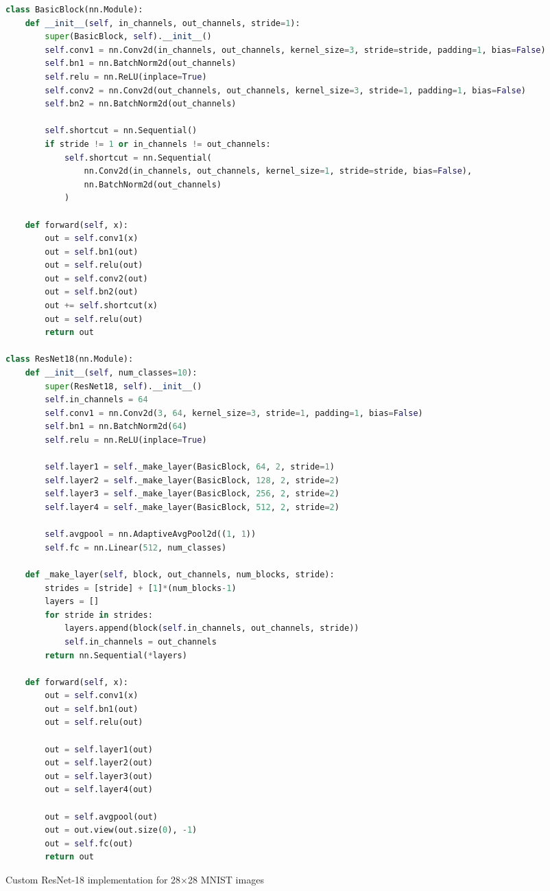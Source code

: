 \documentclass[9pt,a4paper,twocolumn,twoside]{tau-class/tau}
\begin{document}
        \begin{code}
            \begin{lstlisting}[language=python]
class BasicBlock(nn.Module):
    def __init__(self, in_channels, out_channels, stride=1):
        super(BasicBlock, self).__init__()
        self.conv1 = nn.Conv2d(in_channels, out_channels, kernel_size=3, stride=stride, padding=1, bias=False)
        self.bn1 = nn.BatchNorm2d(out_channels)
        self.relu = nn.ReLU(inplace=True)
        self.conv2 = nn.Conv2d(out_channels, out_channels, kernel_size=3, stride=1, padding=1, bias=False)
        self.bn2 = nn.BatchNorm2d(out_channels)
        
        self.shortcut = nn.Sequential()
        if stride != 1 or in_channels != out_channels:
            self.shortcut = nn.Sequential(
                nn.Conv2d(in_channels, out_channels, kernel_size=1, stride=stride, bias=False),
                nn.BatchNorm2d(out_channels)
            )

    def forward(self, x):
        out = self.conv1(x)
        out = self.bn1(out)
        out = self.relu(out)
        out = self.conv2(out)
        out = self.bn2(out)
        out += self.shortcut(x)
        out = self.relu(out)
        return out

class ResNet18(nn.Module):
    def __init__(self, num_classes=10):
        super(ResNet18, self).__init__()
        self.in_channels = 64
        self.conv1 = nn.Conv2d(3, 64, kernel_size=3, stride=1, padding=1, bias=False)
        self.bn1 = nn.BatchNorm2d(64)
        self.relu = nn.ReLU(inplace=True)
        
        self.layer1 = self._make_layer(BasicBlock, 64, 2, stride=1)
        self.layer2 = self._make_layer(BasicBlock, 128, 2, stride=2)
        self.layer3 = self._make_layer(BasicBlock, 256, 2, stride=2)
        self.layer4 = self._make_layer(BasicBlock, 512, 2, stride=2)
        
        self.avgpool = nn.AdaptiveAvgPool2d((1, 1))
        self.fc = nn.Linear(512, num_classes)

    def _make_layer(self, block, out_channels, num_blocks, stride):
        strides = [stride] + [1]*(num_blocks-1)
        layers = []
        for stride in strides:
            layers.append(block(self.in_channels, out_channels, stride))
            self.in_channels = out_channels
        return nn.Sequential(*layers)

    def forward(self, x):
        out = self.conv1(x)
        out = self.bn1(out)
        out = self.relu(out)
        
        out = self.layer1(out)
        out = self.layer2(out)
        out = self.layer3(out)
        out = self.layer4(out)
        
        out = self.avgpool(out)
        out = out.view(out.size(0), -1)
        out = self.fc(out)
        return out
            \end{lstlisting}
            \caption{Custom ResNet-18 implementation for 28$\times$28 MNIST images}
            \label{lst:resnet18mnist}
        \end{code}
\end{document}
